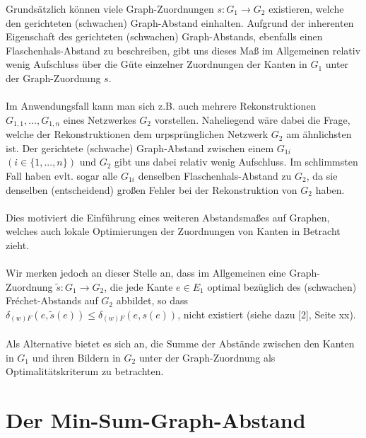 \documentclass[a4paper, 12pt, twoside]{article}
\theoremstyle{Format1} %
\begin{document}
Grundsätzlich können viele Graph-Zuordnungen $s: G_1 \to G_2$ existieren, welche den gerichteten (schwachen) Graph-Abstand einhalten.
Aufgrund der inherenten Eigenschaft des gerichteten (schwachen) Graph-Abstands, ebenfalls einen Flaschenhals-Abstand zu beschreiben, gibt uns dieses Maß im
Allgemeinen relativ wenig Aufschluss über die Güte einzelner Zuordnungen der Kanten in $G_1$ unter der Graph-Zuordnung $s$.
\\
\\
Im Anwendungsfall kann man sich z.B. auch mehrere Rekonstruktionen $G_{1,1}, ..., G_{1,n}$ eines Netzwerkes $G_2$ vorstellen.
Naheliegend wäre dabei die Frage, welche der Rekonstruktionen dem urpsprünglichen Netzwerk $G_2$ am ähnlichsten ist.
Der gerichtete (schwache) Graph-Abstand zwischen einem $G_{1i}$ $(i \in \{1,...,n\})$ und $G_2$ gibt uns dabei relativ wenig Aufschluss.
Im schlimmsten Fall haben evlt. sogar alle $G_{1i}$ denselben Flaschenhals-Abstand zu $G_2$, da sie denselben (entscheidend) großen Fehler bei der Rekonstruktion von $G_2$ haben.
\\
\\
Dies motiviert die Einführung eines weiteren Abstandsmaßes auf Graphen, welches auch lokale Optimierungen der Zuordnungen von Kanten in Betracht zieht.
\\
\\
Wir merken jedoch an dieser Stelle an, dass im Allgemeinen eine Graph-Zuordnung $\tilde{s}: G_1 \to G_2$, die jede Kante $e \in E_1$ optimal bezüglich des (schwachen)
Fréchet-Abstands auf $G_2$ abbildet, so dass $\delta_{(w)F}(e, \tilde{s}(e)) \leq \delta_{(w)F}(e, s(e))$, nicht existiert (siehe dazu [2], Seite xx).
\\
\\
Als Alternative bietet es sich an, die Summe der Abstände zwischen den Kanten in $G_1$ und ihren Bildern in $G_2$ unter der Graph-Zuordnung als Optimalitätskriterum zu betrachten.

\section{Der Min-Sum-Graph-Abstand}
\end{document}
